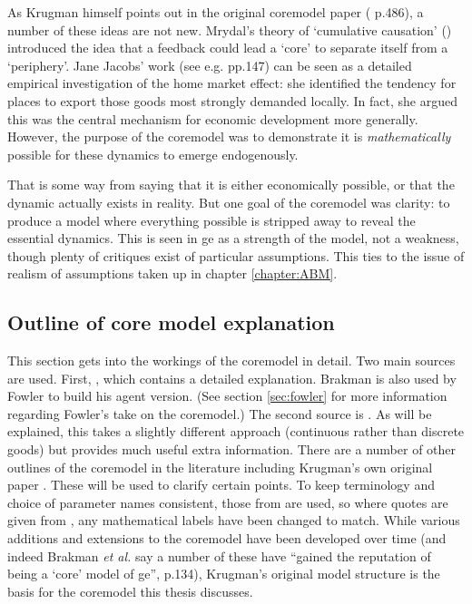 As Krugman himself points out in the original \gls{coremodel} paper (\citealt{krugman_increasing_1991} p.486),  a number of these ideas are not new. Mrydal's theory of `cumulative causation' (\citeyear{myrdal_economic_1957}) introduced the idea that a feedback could lead a `core' to separate itself from a `periphery'. Jane Jacobs' work (see e.g. \citealt{jacobs_cities_1986} pp.147) can be seen as a detailed empirical investigation of the home market effect: she identified the tendency for places to export those goods most strongly demanded locally. In fact, she argued this was the central mechanism for economic development more generally. However, the purpose of the \gls{coremodel} was to demonstrate it is \emph{mathematically} possible for these dynamics to emerge endogenously. 

That is some way from saying that it is either economically possible, or that the dynamic actually exists in reality. But one goal of the \gls{coremodel} was clarity: to produce a model where everything possible is stripped away to reveal the essential dynamics. This is seen in \gls{ge} as a strength of the model, not a weakness, though plenty of critiques exist of particular assumptions. This ties to the issue of realism of assumptions taken up in chapter \ref{chapter:ABM}. 

\subsection{Outline of core model explanation}

This section gets into the workings of the \gls{coremodel} in detail. Two main sources are used. First, \citealt{brakman_new_2009}, which contains a detailed explanation. Brakman is also used by Fowler to build his agent version. (See section \ref{sec:fowler} for more information regarding Fowler's take on the \gls{coremodel}.) The second source is \citealt{fujita_spatial_2001}. As will be explained, this takes a slightly different approach (continuous rather than discrete goods) but provides much useful extra information. There are a number of other outlines of the \gls{coremodel} in the literature including Krugman's own original paper \citep{krugman_increasing_1991}. These will be used to clarify certain points. To keep terminology and choice of parameter names consistent, those from \citeauthor{brakman_new_2009} are used, so where quotes are given from \citealt{fujita_spatial_2001}, any mathematical labels have been changed to match. While various additions and extensions to the \gls{coremodel} have been developed over time (and indeed Brakman \emph{et al.} say a number of these have ``gained the reputation of being a `core' model of \gls{ge}'', p.134), Krugman's original model structure is the basis for the \gls{coremodel} this thesis discusses.

